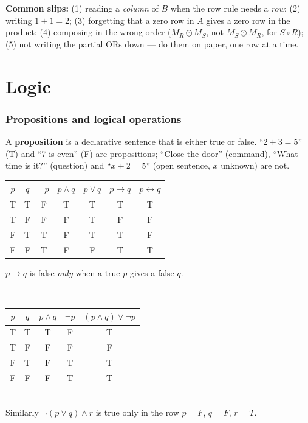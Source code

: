\documentclass{fkt-notes}
\newcommand{\src}[1]{\par\noindent{\small\itshape Source: #1}\par\smallskip}
\newcommand{\kolman}[1]{\setcounter{section}{\numexpr#1-1\relax}}
\theoremstyle{definition}
\begin{document}
\begin{rulepar}
  \textbf{Common slips:} (1) reading a \emph{column} of $B$ when the row
  rule needs a \emph{row}; (2) writing $1+1=2$; (3) forgetting that a zero
  row in $A$ gives a zero row in the product; (4) composing in the wrong
  order ($M_R\odot M_S$, not $M_S\odot M_R$, for $S\circ R$); (5) not
  writing the partial ORs down --- do them on paper, one row at a time.
\end{rulepar}

\newpage
\part{Logic}

\kolman{1}
\section{Propositions and logical operations}\src{Kolman 2.1}
%

A \textbf{proposition} is a declarative sentence that is either true or
false. ``$2+3=5$'' (T) and ``7 is even'' (F) are propositions; ``Close the
door'' (command), ``What time is it?'' (question) and ``$x+2=5$'' (open
sentence, $x$ unknown) are not.

\begin{center}
  \begin{tabular}{@{}cc|c|c|c|c|c@{}}
    $p$ & $q$ & $\neg p$ & $p\wedge q$ & $p\vee q$ & $p\to q$ & $p\leftrightarrow q$ \\\hline
    T   & T   & F        & T           & T         & T        & T                    \\
    T   & F   & F        & F           & T         & F        & F                    \\
    F   & T   & T        & F           & T         & T        & F                    \\
    F   & F   & T        & F           & F         & T        & T
  \end{tabular}
\end{center}
$p\to q$ is false \emph{only} when a true $p$ gives a false $q$.

\begin{example}[2.1 Ex.~5]\leavevmode\\[2pt]
  \begin{tabular}[t]{@{}cc|cc|c@{}}
    $p$ & $q$ & $p\wedge q$ & $\neg p$ & $(p\wedge q)\vee\neg p$ \\\hline
    T   & T   & T           & F        & T                       \\ T&F&F&F&F\\ F&T&F&T&T\\ F&F&F&T&T
  \end{tabular}
  \\[2pt]
  Similarly $\neg(p\vee q)\wedge r$ is true only in the row $p=F$, $q=F$, $r=T$.
\end{example}
\end{document}
